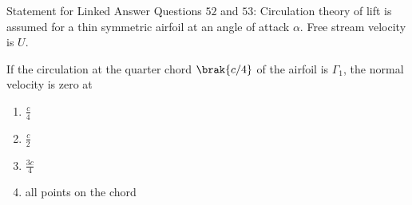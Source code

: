 Statement for Linked Answer Questions $52$ and $53$: Circulation theory of lift is assumed for a thin symmetric airfoil at an angle of attack $\alpha$. Free stream velocity is $U$.
\item If the circulation at the quarter chord $\brak{c/4}$ of the airfoil is $\Gamma _1$, the normal velocity is zero at
	\begin{enumerate}
		\item $\frac{c}{4}$
		\item $\frac{c}{2}$
		\item $\frac{3c}{4}$
		\item all points on the chord
	\end{enumerate}

